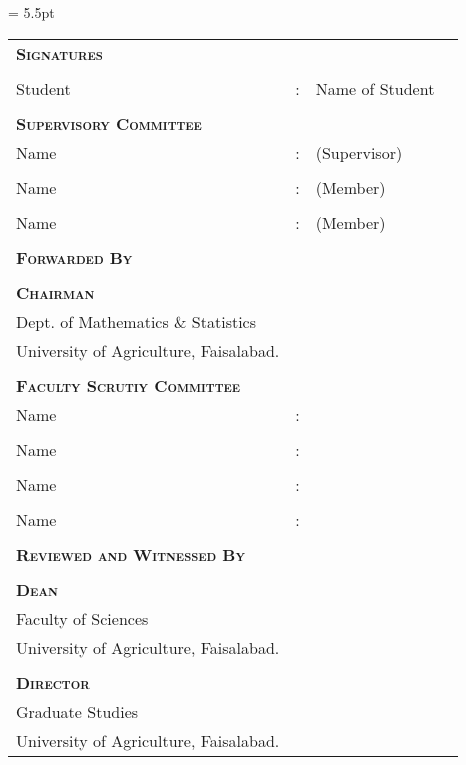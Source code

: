 \pagestyle{empty}

\begingroup
\tabcolsep = 5.5pt
\def\arraystretch{0.95}

\begin{tabular}{lclc}
\textbf{\textsc{Signatures}} &  &  & \tabularnewline
 &  &  & \tabularnewline
Student & : & Name of Student & \raisebox{-0.25cm}{\rule{0.3\columnwidth}{1pt}}\tabularnewline
 &  &  & \tabularnewline
\textbf{\textsc{Supervisory Committee}} &  &  & \tabularnewline
Name & : & (Supervisor) & \raisebox{-0.25cm}{\rule{0.3\columnwidth}{1pt}}\tabularnewline
 &  &  & \tabularnewline
Name & : & (Member) & \raisebox{-0.25cm}{\rule{0.3\columnwidth}{1pt}}\tabularnewline
 &  &  & \tabularnewline
Name & : & (Member) & \raisebox{-0.25cm}{\rule{0.3\columnwidth}{1pt}}\tabularnewline
 &  &  & \tabularnewline
\textbf{\textsc{Forwarded By}} &  &  & \tabularnewline
 &  &  & \tabularnewline
\textbf{\textsc{Chairman}} &  &  & \tabularnewline
Dept. of Mathematics \& Statistics &  &  & \tabularnewline
University of Agriculture, Faisalabad. &  &  & \tabularnewline
 &  &  & \tabularnewline
\textbf{\textsc{Faculty Scrutiy Committee}} &  &  & \tabularnewline
Name & : &  & \raisebox{-0.25cm}{\rule{0.3\columnwidth}{1pt}}\tabularnewline
 &  &  & \tabularnewline
Name & : &  & \raisebox{-0.25cm}{\rule{0.3\columnwidth}{1pt}}\tabularnewline
 &  &  & \tabularnewline
Name & : &  & \raisebox{-0.25cm}{\rule{0.3\columnwidth}{1pt}}\tabularnewline
 &  &  & \tabularnewline
Name & : &  & \raisebox{-0.25cm}{\rule{0.3\columnwidth}{1pt}}\tabularnewline
 &  &  & \tabularnewline
\textbf{\textsc{Reviewed and Witnessed By}} &  &  & \tabularnewline
 &  &  & \tabularnewline
\textbf{\textsc{Dean}} &  &  & \tabularnewline
Faculty of Sciences &  &  & \tabularnewline
University of Agriculture, Faisalabad. &  &  & \tabularnewline
 &  &  & \tabularnewline
\textbf{\textsc{Director}} &  &  & \tabularnewline
Graduate Studies &  &  & \tabularnewline
University of Agriculture, Faisalabad. &  &  & \tabularnewline
\end{tabular}

\endgroup